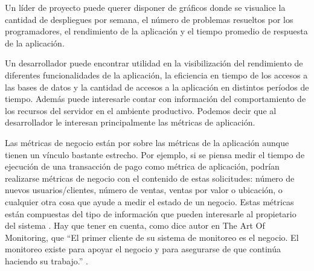 Un líder de proyecto puede querer disponer de gráficos donde se visualice la
cantidad de despliegues por semana, el número de problemas resueltos por los
programadores, el rendimiento de la aplicación y el tiempo promedio de
respuesta de la aplicación.

Un desarrollador puede encontrar utilidad en la visibilización del rendimiento
de diferentes funcionalidades de la aplicación, la eficiencia en tiempo de los
accesos a las bases de datos y la cantidad de accesos a la aplicación en
distintos períodos de tiempo. Además puede interesarle contar con información
del comportamiento de los recursos del servidor en el ambiente productivo.
Podemos decir que al desarrollador le interesan principalmente las métricas de
aplicación.

Las métricas de negocio están por sobre las métricas de la aplicación aunque
tienen un vínculo bastante estrecho. Por ejemplo, si se piensa medir el tiempo
de ejecución de una transacción de pago como métrica de aplicación, podrían
realizarse métricas de negocio con el contenido de estas solicitudes: número de
nuevos usuarios/clientes, número de ventas, ventas por valor o ubicación, o
cualquier otra cosa que ayude a medir el estado de un negocio. Estas métricas
están compuestas del tipo de información que pueden interesarle al propietario
del sistema \cite[p.~446]{monitoreo:art_of_monitoring}. Hay que tener en
cuenta, como dice autor en The Art Of Monitoring, que “El primer cliente de su
sistema de monitoreo es el negocio. El monitoreo existe para apoyar el negocio
y para asegurarse de que continúa haciendo su trabajo.”
\cite[p.~8]{monitoreo:art_of_monitoring}.

